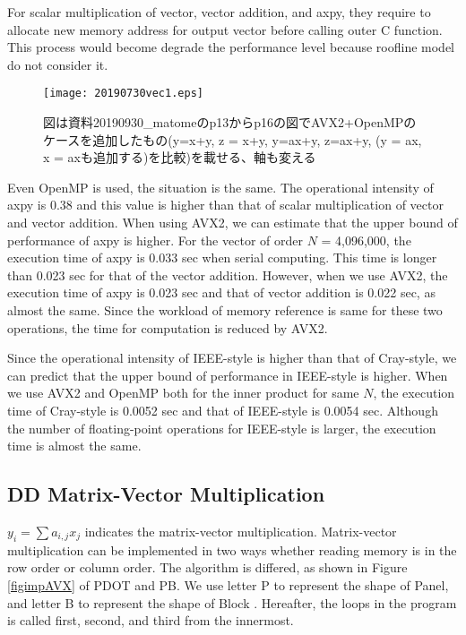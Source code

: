 \documentclass{IOS-Book-Article}
\begin{document}
For scalar multiplication of vector, vector addition, and axpy, they require to allocate new memory address for output vector before calling outer C function. This process would become degrade the performance level because roofline model do not consider it.
\begin{figure}[htbp]
  \begin{center}
    \texttt{[image: 20190730vec1.eps]}
    \caption{図は資料20190930\_matomeのp13からp16の図でAVX2+OpenMPのケースを追加したもの(y=x+y, z = x+y, y=ax+y, z=ax+y, (y = ax, x = axも追加する)を比較)を載せる、軸も変える}
    \label{xd}
  \end{center}
\end{figure}

Even OpenMP is used, the situation is the same. The operational intensity of axpy is 0.38 and this value is higher than that of scalar multiplication of vector and vector addition. When using AVX2, we can estimate that the upper bound of performance of axpy is higher. For the vector of order $N$ = 4,096,000, the execution time of axpy is 0.033 sec when serial computing. This time is longer than 0.023 sec for that of the vector addition. However, when we use AVX2, the execution time of axpy is 0.023 sec and that of vector addition is 0.022 sec, as almost the same. Since the workload of memory reference is same for these two operations, the time for computation is reduced by AVX2.

Since the operational intensity of IEEE-style is higher than that of Cray-style, we can predict that the upper bound of performance in IEEE-style is higher. When we use AVX2 and OpenMP both for the inner product for same $N$, the execution time of Cray-style is 0.0052 sec and that of IEEE-style is 0.0054 sec. Although the number of floating-point operations for IEEE-style is larger, the execution time is almost the same.

\subsection{DD Matrix-Vector Multiplication}
$y_{i} = \sum a_{i,j}x_{j}$ indicates the matrix-vector multiplication. 
Matrix-vector multiplication can be implemented in two ways whether reading memory is in the row order or column order. The algorithm is differed, as shown in Figure \ref{figimpAVX} of PDOT and PB. We use letter P to represent the shape of Panel, and letter B to represent the shape of Block \cite{goto}. Hereafter, the loops in the program is called first, second, and third from the innermost.
\end{document}

